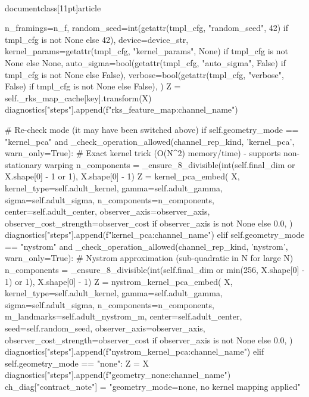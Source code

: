\\documentclass[11pt]{article}
\begin{document}
\begin{CodeBlock}
                            n_framings=n_f,
                            random_seed=int(getattr(tmpl_cfg, "random_seed", 42) if tmpl_cfg is not None else 42),
                            device=device_str,
                            kernel_params=getattr(tmpl_cfg, "kernel_params", None) if tmpl_cfg is not None else None,
                            auto_sigma=bool(getattr(tmpl_cfg, "auto_sigma", False) if tmpl_cfg is not None else False),
                            verbose=bool(getattr(tmpl_cfg, "verbose", False) if tmpl_cfg is not None else False),
                        )
                    Z = self._rks_map_cache[key].transform(X)
                    diagnostics["steps"].append(f"rks_feature_map:{channel_name}")

            # Re-check mode (it may have been switched above)
            if self.geometry_mode == "kernel_pca" and _check_operation_allowed(channel_rep_kind, 'kernel_pca', warn_only=True):
                # Exact kernel trick (O(N^2) memory/time) - supports non-stationary warping
                n_components = _ensure_8_divisible(int(self.final_dim or X.shape[0] - 1 or 1), X.shape[0] - 1)
                Z = kernel_pca_embed(
                    X,
                    kernel_type=self.adult_kernel,
                    gamma=self.adult_gamma,
                    sigma=self.adult_sigma,
                    n_components=n_components,
                    center=self.adult_center,
                    observer_axis=observer_axis,
                    observer_cost_strength=observer_cost if observer_axis is not None else 0.0,
                )
                diagnostics["steps"].append(f"kernel_pca:{channel_name}")
            elif self.geometry_mode == "nystrom" and _check_operation_allowed(channel_rep_kind, 'nystrom', warn_only=True):
                # Nystrom approximation (sub-quadratic in N for large N)
                n_components = _ensure_8_divisible(int(self.final_dim or min(256, X.shape[0] - 1) or 1), X.shape[0] - 1)
                Z = nystrom_kernel_pca_embed(
                    X,
                    kernel_type=self.adult_kernel,
                    gamma=self.adult_gamma,
                    sigma=self.adult_sigma,
                    n_components=n_components,
                    m_landmarks=self.adult_nystrom_m,
                    center=self.adult_center,
                    seed=self.random_seed,
                    observer_axis=observer_axis,
                    observer_cost_strength=observer_cost if observer_axis is not None else 0.0,
                )
                diagnostics["steps"].append(f"nystrom_kernel_pca:{channel_name}")
            elif self.geometry_mode == "none":
                Z = X
                diagnostics["steps"].append(f"geometry_none:{channel_name}")
                ch_diag["contract_note"] = "geometry_mode=none, no kernel mapping applied"


\end{CodeBlock}
\end{document}
